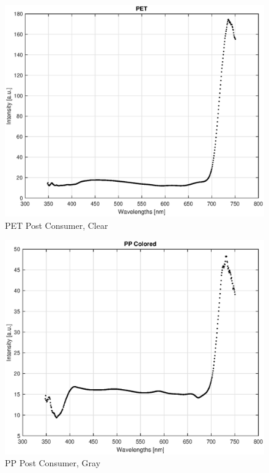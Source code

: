 \begin{appendices}
\begin{figure}
    \centering
    \includegraphics[width = 12cm]{Images/appendix/pet-postconsum.eps}
    \caption[$\; \:$PET Post Consumer]{PET Post Consumer, Clear}
    \label{fig:pet-pc}
\end{figure}

\begin{figure}
    \centering
    \includegraphics[width = 12cm]{Images/appendix/pp-postconsum-gray.eps}
    \caption[$\; \:$PP Post Consumer]{PP Post Consumer, Gray}
    \label{fig:pp-gray}
\end{figure}


\end{appendices}
